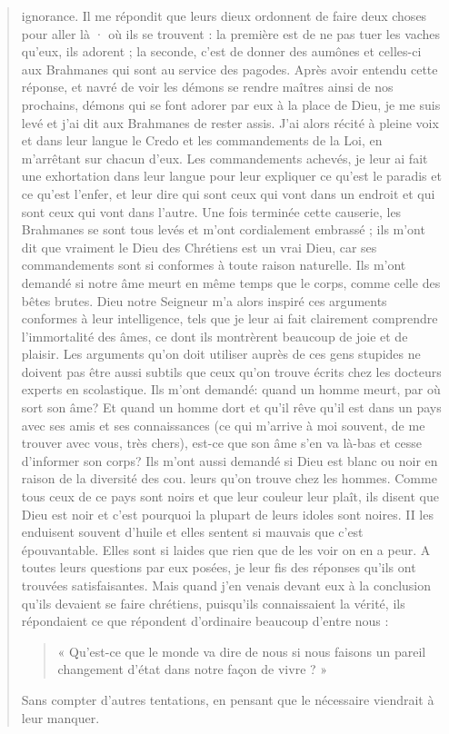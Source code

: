 \begin{quote}
ignorance. Il me répondit que leurs dieux ordonnent de faire deux
choses pour aller là · où ils se trouvent : la première est de ne pas
tuer les vaches qu'eux, ils adorent ; la seconde, c'est de donner des
aumônes et celles-ci aux Brahmanes qui sont au service des pagodes.
Après avoir entendu cette réponse, et navré de voir les démons
se rendre maîtres ainsi de nos prochains, démons qui se font adorer
par eux à la place de Dieu, je me suis levé et j'ai dit aux Brahmanes
de rester assis. J'ai alors récité à pleine voix et dans leur langue
le Credo et les commandements de la Loi, en m'arrêtant sur
chacun d'eux. Les commandements achevés, je leur ai fait une
exhortation dans leur langue pour leur expliquer ce qu'est le paradis
et ce qu'est l'enfer, et leur dire qui sont ceux qui vont dans un
endroit et qui sont ceux qui vont dans l'autre. Une fois terminée
cette causerie, les Brahmanes se sont tous levés et m'ont cordialement
embrassé ; ils m'ont dit que vraiment le Dieu des Chrétiens
est un vrai Dieu, car ses commandements sont si conformes à toute
raison naturelle.
Ils m'ont demandé si notre âme meurt en même temps que le
corps, comme celle des bêtes brutes. Dieu notre Seigneur m'a alors
inspiré ces arguments conformes à leur intelligence, tels que je leur
ai fait clairement comprendre l'immortalité des âmes, ce dont ils
montrèrent beaucoup de joie et de plaisir. Les arguments qu'on
doit utiliser auprès de ces gens stupides ne doivent pas être aussi
subtils que ceux qu'on trouve écrits chez les docteurs experts en
scolastique. Ils m'ont demandé: quand un homme meurt, par où
sort son âme? Et quand un homme dort et qu'il rêve qu'il est dans
un pays avec ses amis et ses connaissances (ce qui m'arrive à moi
souvent, de me trouver avec vous, très chers), est-ce que son âme
s'en va là-bas et cesse d'informer son corps? Ils m'ont aussi
demandé si Dieu est blanc ou noir en raison de la diversité des cou.
leurs qu'on trouve chez les hommes. Comme tous ceux de ce pays
sont noirs et que leur couleur leur plaît, ils disent que Dieu est noir
et c'est pourquoi la plupart de leurs idoles sont noires. II les enduisent
souvent d'huile et elles sentent si mauvais que c'est épouvantable.
Elles sont si laides que rien que de les voir on en a peur. A
toutes leurs questions par eux posées, je leur fis des réponses qu'ils
ont trouvées satisfaisantes. Mais quand j'en venais devant eux à
la conclusion qu'ils devaient se faire chrétiens, puisqu'ils connaissaient
la vérité, ils répondaient ce que répondent d'ordinaire
    beaucoup d'entre nous : \begin{quote}
        « Qu'est-ce que le monde va dire de nous
si nous faisons un pareil changement d'état dans notre façon de
vivre ? » 
    \end{quote}Sans compter d'autres tentations, en pensant que le nécessaire
viendrait à leur manquer.



\end{quote}

